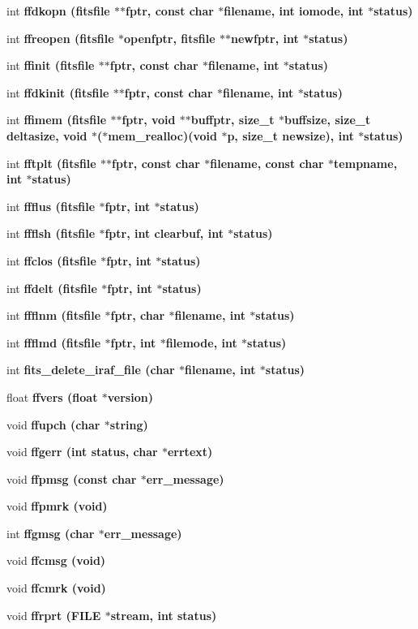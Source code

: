 \begin{CompactItemize}
int \bf{ffdkopn} (\bf{fitsfile} $\ast$$\ast$fptr, const char $\ast$filename, int iomode, int $\ast$status)
\item 
int \bf{ffreopen} (\bf{fitsfile} $\ast$openfptr, \bf{fitsfile} $\ast$$\ast$newfptr, int $\ast$status)
\item 
int \bf{ffinit} (\bf{fitsfile} $\ast$$\ast$fptr, const char $\ast$filename, int $\ast$status)
\item 
int \bf{ffdkinit} (\bf{fitsfile} $\ast$$\ast$fptr, const char $\ast$filename, int $\ast$status)
\item 
int \bf{ffimem} (\bf{fitsfile} $\ast$$\ast$fptr, void $\ast$$\ast$buffptr, size\_\-t $\ast$buffsize, size\_\-t deltasize, void $\ast$($\ast$mem\_\-realloc)(void $\ast$p, size\_\-t newsize), int $\ast$status)
\item 
int \bf{fftplt} (\bf{fitsfile} $\ast$$\ast$fptr, const char $\ast$filename, const char $\ast$tempname, int $\ast$status)
\item 
int \bf{ffflus} (\bf{fitsfile} $\ast$fptr, int $\ast$status)
\item 
int \bf{ffflsh} (\bf{fitsfile} $\ast$fptr, int clearbuf, int $\ast$status)
\item 
int \bf{ffclos} (\bf{fitsfile} $\ast$fptr, int $\ast$status)
\item 
int \bf{ffdelt} (\bf{fitsfile} $\ast$fptr, int $\ast$status)
\item 
int \bf{ffflnm} (\bf{fitsfile} $\ast$fptr, char $\ast$filename, int $\ast$status)
\item 
int \bf{ffflmd} (\bf{fitsfile} $\ast$fptr, int $\ast$filemode, int $\ast$status)
\item 
int \bf{fits\_\-delete\_\-iraf\_\-file} (char $\ast$filename, int $\ast$status)
\item 
float \bf{ffvers} (float $\ast$version)
\item 
void \bf{ffupch} (char $\ast$string)
\item 
void \bf{ffgerr} (int status, char $\ast$errtext)
\item 
void \bf{ffpmsg} (const char $\ast$err\_\-message)
\item 
void \bf{ffpmrk} (void)
\item 
int \bf{ffgmsg} (char $\ast$err\_\-message)
\item 
void \bf{ffcmsg} (void)
\item 
void \bf{ffcmrk} (void)
\item 
void \bf{ffrprt} (FILE $\ast$stream, int status)
\item 
$$
\end{CompactItemize}
